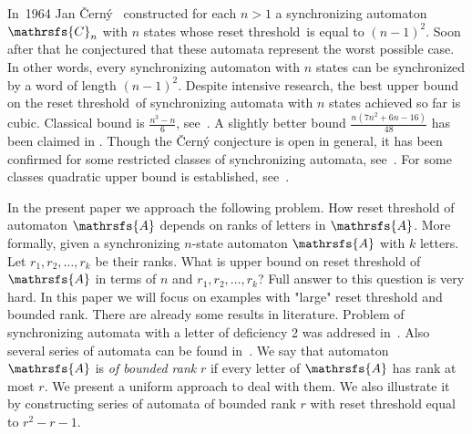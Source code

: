 \documentclass[11pt]{llncs}
\newcommand{\rl}{reset threshold}
\newcommand{\A}{\mathrsfs{A}}
\begin{document}
In~1964 Jan \v{C}ern\'{y}~\cite{Ce64} constructed for each $n>1$ a
synchronizing automaton $\mathrsfs{C}_n$ with $n$ states whose \rl\ is equal to
$(n-1)^2$. Soon after that he conjectured that these automata represent the
worst possible case. In other words, every synchronizing automaton with $n$ states can
be synchronized by a word of length $(n-1)^2$. Despite intensive research, the best
upper bound on the \rl\ of synchronizing automata with $n$ states achieved so
far is cubic. Classical bound is $\frac{n^3-n}6$, see~\cite{Pi83}. A slightly better bound
$\frac{n(7n^2+6n-16)}{48}$ has been claimed in \cite{Tr11}.
Though the \v{C}ern\'{y} conjecture is open in general, it
has been confirmed for some restricted classes of synchronizing automata, see~\cite{AS09,Du98,Ka03,Tr07,Vo09}.
For some classes quadratic upper bound is established, see~\cite{BBP,Rys}.

In the present paper we approach the following problem. How reset threshold of automaton $\A$ depends
on ranks of letters in $\A$. More formally, given a synchronizing $n$-state automaton $\A$
with $k$ letters. Let $r_1, r_2, \ldots, r_k$ be their ranks. What is upper bound
on reset threshold of $\A$ in terms of $n$ and $r_1, r_2, \ldots, r_k$?
Full answer to this question is very hard. In this paper we will focus on examples with "large" reset threshold
and bounded rank. There are already some results in literature. Problem of synchronizing automata
with a letter of deficiency 2 was addresed in~\cite{AVZ}. Also several series of automata can be found in~\cite{AGV}.
We say that automaton $\A$ is \emph{of bounded rank} $r$ if every letter of $\A$ has rank at most $r$. We present
a uniform approach to deal with them. We also illustrate it by constructing series of automata of bounded rank $r$
with reset threshold equal to $r^2 -r - 1$.
\end{document}
